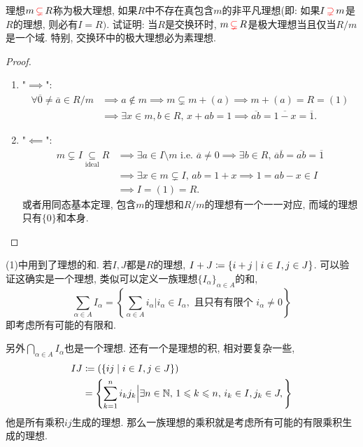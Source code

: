 \documentclass{../solutions-cn}
\begin{document}
\begin{exercise}[习题2.1.6]
    理想$m \,\textcolor{red}{\subsetneq}\, R$称为极大理想, 如果$R$中不存在真包含$m$的非平凡理想(即: 如果$I \,\textcolor{red}{\supsetneq}\, m$是$R$的理想, 则必有$I = R)$. 试证明: 当$R$是交换环时, $m \,\textcolor{red}{\subsetneq}\, R$是极大理想当且仅当$R/m$是一个域. 特别, 交换环中的极大理想必为素理想.
\end{exercise}

\begin{proof}
    \begin{enumerate}[(1)]
        \item "$\implies$":
        \[
        \begin{aligned}
            \forall \overline{0} \neq \overline{a} \in R/m &\implies a \notin m \implies m \subsetneq m + (a) \implies m + (a) = R = (1)\\
            &\implies \exists x \in m, b \in R,\, x + ab = 1 \implies \overline{ab} = \overline{1 - x} = \overline{1}.
        \end{aligned}
        \]
        \item "$\impliedby$":
        \[
        \begin{aligned}
            m \subsetneq I \underset{\text{ideal}}{\subseteq} R &\implies \exists a \in I \setminus m \text{ i.e. } \overline{a} \neq 0 \implies \exists b \in R,\, \overline{a}\overline{b} = \overline{ab} = \overline{1}\\
            &\implies \exists x \in m \subsetneq I,\, ab = 1 + x \implies 1 = ab - x \in I \\
            &\implies I = (1) = R.
        \end{aligned}
        \]
        或者用同态基本定理, 包含$m$的理想和$R/m$的理想有一个一一对应, 而域的理想只有$\{0\}$和本身.
    \end{enumerate}
\end{proof}

\begin{remark}
     (1)中用到了理想的和. 若$I, J$都是$R$的理想, $I + J \mathrel{\coloneqq} \{i + j \mid i \in I, j \in J\}$. 可以验证这确实是一个理想, 类似可以定义一族理想$\{I_\alpha\}_{\alpha \in A}$的和,
    \[
        \sum_{\alpha \in A} I_\alpha = \left\{\sum_{\alpha \in A} i_\alpha \Big|i_\alpha \in I_\alpha, \text{ 且只有有限个 } i_\alpha \neq 0 \right\} 
    \]
    即考虑所有可能的有限和.
    
    另外$\bigcap_{\alpha \in A} I_\alpha$也是一个理想. 还有一个是理想的积, 相对要复杂一些,
    \[
    \begin{aligned}
        IJ &\mathrel{\coloneqq} (\{ij \mid i \in I, j \in J\})\\
        &= \left\{\sum_{k = 1}^{n} i_kj_k \Big| \exists n \in \mathbb{N},\, 1 \leqslant k \leqslant n,\, i_k \in I, j_k \in J, \right\}
    \end{aligned}  
    \]
    他是所有乘积$ij$生成的理想. 那么一族理想的乘积就是考虑所有可能的有限乘积生成的理想.
\end{remark}
\end{document}
